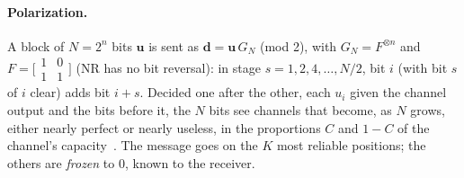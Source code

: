 \documentclass[11pt,a4paper]{article}
\theoremstyle{remark}
\begin{document}
\paragraph{Polarization.}
A block of $N = 2^n$ bits $\bm u$ is sent as $\bm d = \bm u\, G_N$ (mod 2), with $G_N = F^{\otimes n}$ and $F = \bigl[\begin{smallmatrix}1 & 0\\ 1 & 1\end{smallmatrix}\bigr]$ (NR has no bit reversal): in stage $s = 1, 2, 4, \dots, N/2$, bit $i$ (with bit $s$ of $i$ clear) adds bit $i + s$. Decided one after the other, each $u_i$ given the channel output and the bits before it, the $N$ bits see channels that become, as $N$ grows, either nearly perfect or nearly useless, in the proportions $C$ and $1 - C$ of the channel's capacity~\cite{arikan}. The message goes on the $K$ most reliable positions; the others are \emph{frozen} to $0$, known to the receiver.
\end{document}
